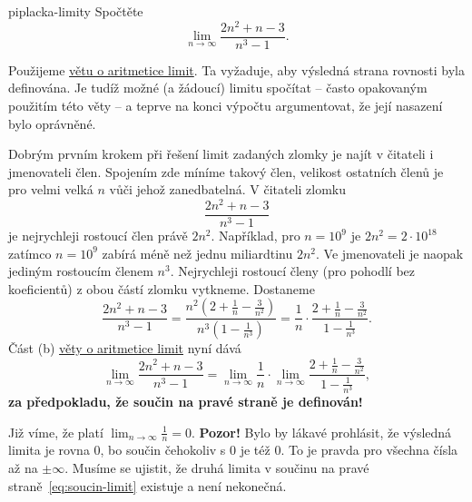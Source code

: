 \begin{problem}{}{piplacka-limity}
 Spočtěte
 \[
  \lim_{n \to \infty} \frac{2n^2+n-3}{n^3-1}.
 \]
\end{problem}
\begin{probsol}
 Použijeme \hyperref[thm:aritmetika-limit]{větu o aritmetice limit}. Ta
 vyžaduje, aby výsledná strana rovnosti byla definována. Je tudíž možné (a
 žádoucí) limitu spočítat -- často opakovaným použitím této věty -- a teprve na
 konci výpočtu argumentovat, že její nasazení bylo oprávněné.

 Dobrým prvním krokem při řešení limit zadaných zlomky je najít v čitateli i
 jmenovateli  člen. Spojením 
 zde míníme takový člen, velikost ostatních členů je pro velmi velká $n$ vůči
 jehož zanedbatelná. V čitateli zlomku
 \[
  \frac{2n^2 + n - 3}{n^3 - 1}
 \]
 je nejrychleji rostoucí člen právě $2n^2$. Například, pro $n = 10^9$ je $2n^2 =
 2 \cdot 10^{18}$ zatímco $n = 10^9$ zabírá méně než jednu miliardtinu $2n^2$.
 Ve jmenovateli je naopak jediným rostoucím členem $n^3$. Nejrychleji rostoucí
 členy (pro pohodlí bez koeficientů) z obou částí zlomku vytkneme. Dostaneme
 \[
  \frac{2n^2 + n - 3}{n^3 - 1} = \frac{n^2 \left( 2 + \frac{1}{n} -
  \frac{3}{n^2} \right)}{n^3 \left(1 - \frac{1}{n^3}\right)} = \frac{1}{n} \cdot
  \frac{2 + \frac{1}{n} - \frac{3}{n^2}}{1 - \frac{1}{n^3}}.
 \]
 Část (b) \hyperref[thm:aritmetika-limit]{věty o aritmetice limit} nyní dává
 \begin{equation*}
  \label{eq:soucin-limit}
  \tag{$\triangle$}
  \lim_{n \to \infty} \frac{2n^2 + n - 3}{n^3 - 1} = \lim_{n \to \infty}
  \frac{1}{n} \cdot \lim_{n \to \infty} \frac{2 + \frac{1}{n} - \frac{3}{n^2}}{1
  - \frac{1}{n^3}},
 \end{equation*}
 \textbf{za předpokladu, že součin na pravé straně je definován!}

 Již víme, že platí $\lim_{n \to \infty} \frac{1}{n} = 0$. \textbf{Pozor!} Bylo
 by lákavé prohlásit, že výsledná limita je rovna $0$, bo součin čehokoliv s $0$
 je též $0$. To je pravda pro všechna čísla až na $\pm \infty$. Musíme se
 ujistit, že druhá limita v součinu na pravé straně~\eqref{eq:soucin-limit}
 existuje a není nekonečná.


\end{probsol}
